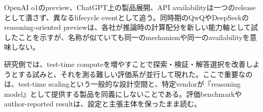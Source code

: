 OpenAI o1のpreview、ChatGPT上の製品展開、API availabilityは一つのreleaseとして潰さず、異なるlifecycle eventとして追う。同時期のQwQやDeepSeekのreasoning-oriented previewは、各社が推論時の計算配分を新しい能力軸として試したことを示すが、名称が似ていても同一のmechanismや同一のavailabilityを意味しない。\autocite{src-14a855188533,src-a452b2dc7f5d,src-ea823ed75f72}


研究側では、test-time computeを増やすことで探索・検証・解答選択を改善しようとする試みと、それを測る難しい評価系が並行して現れた。ここで重要なのは、test-time scalingという一般的な設計空間と、特定vendorが『reasoning model』として提供する製品を同義にしないことである。評価benchmarkやauthor-reported resultは、設定と主張主体を保ったまま読む。\autocite{src-1f00c386f820,src-259b57a1bad9,src-7c2651c80f45,src-9cf289b414fd}



